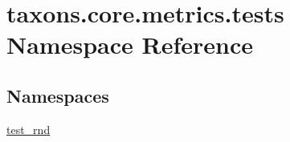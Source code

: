 \hypertarget{namespacetaxons_1_1core_1_1metrics_1_1tests}{}\section{taxons.\+core.\+metrics.\+tests Namespace Reference}
\label{namespacetaxons_1_1core_1_1metrics_1_1tests}
\subsection*{Namespaces}
\begin{DoxyCompactItemize}
\item 
 \hyperlink{namespacetaxons_1_1core_1_1metrics_1_1tests_1_1test__rnd}{test\+\_\+rnd}
\end{DoxyCompactItemize}
